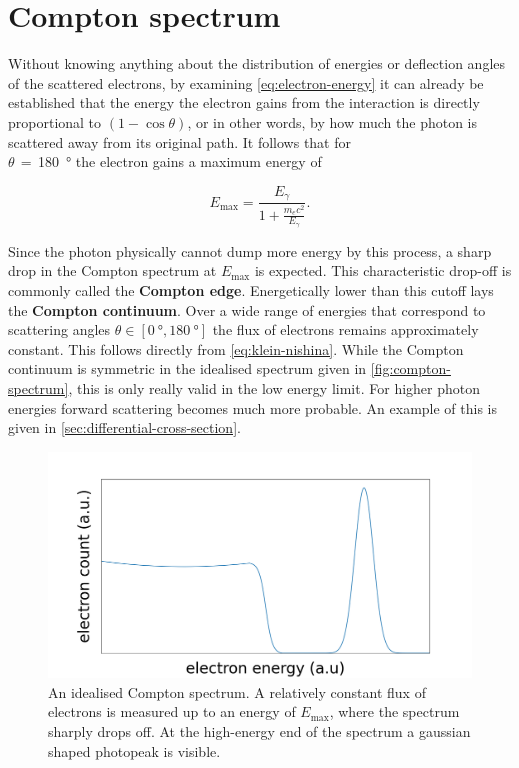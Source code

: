 
\section{Compton spectrum}
\label{sec:compton-spectrum}

Without knowing anything about the distribution of energies or deflection angles of
the scattered electrons, by examining \autoref{eq:electron-energy} it can already be
established that the energy the electron gains from the interaction is directly
proportional to $\left(1-\cos\theta\right)$, or in other words, by how much the
photon is scattered away from its original path. It follows that for \\
$\theta\,=\,$\SI{180}{\degree} the electron gains a maximum energy of

\begin{equation}
\label{eq:maximal-energy}
E_\text{max}=\frac{E_\gamma}{1+\frac{m_e c^2}{E_\gamma}}.
\end{equation}

Since the photon physically cannot dump more energy by this process, a sharp drop in
the Compton spectrum at $E_\text{max}$ is expected. This characteristic drop-off is
commonly called the \textbf{Compton edge}. Energetically lower than this cutoff lays
the \textbf{Compton continuum}. Over a wide range of energies that correspond to 
scattering angles $\theta\in[\SI{0}{\degree},\SI{180}{\degree}]$ the flux of 
electrons remains approximately constant. This follows directly from 
\autoref{eq:klein-nishina}. While the Compton continuum is symmetric in the idealised
spectrum given in \autoref{fig:compton-spectrum}, this is only really valid in the 
low energy limit. For higher photon energies forward scattering becomes much more
probable. An example of this is given in \autoref{sec:differential-cross-section}.

\begin{figure}
	\includegraphics[width=1.0\textwidth]{fig/compton-spectrum}
	\caption{An idealised Compton spectrum. A relatively constant flux of
	electrons is measured up to an energy of $E_\text{max}$, where the spectrum
	sharply drops off. At the high-energy end of the spectrum a gaussian shaped
	photopeak is visible.}
	\label{fig:compton-spectrum}
\end{figure}

